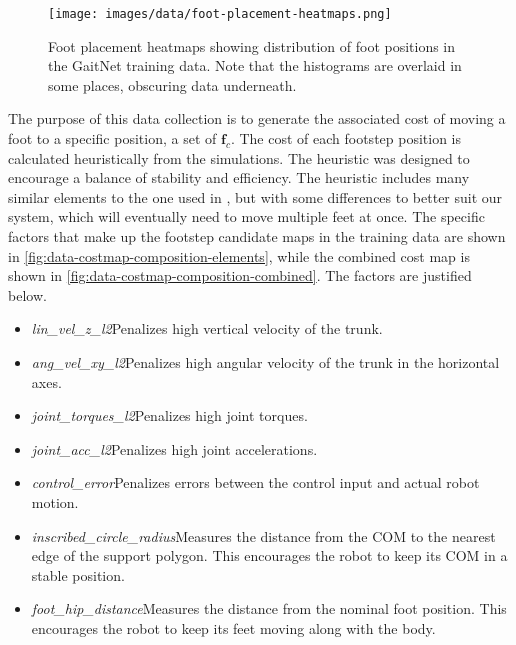 \begin{figure}[H]
  \centering
  \texttt{[image: images/data/foot-placement-heatmaps.png]}
  \caption{Foot placement heatmaps showing distribution of foot
    positions in the GaitNet training data. Note that the histograms
  are overlaid in some places, obscuring data underneath.}
  \label{fig:data-cn-training-distribution}
\end{figure}

The purpose of this data collection is to generate the associated cost of
moving a foot to a specific position, a set of $\mathbf f_c$. The cost
of each footstep position is calculated heuristically from the simulations.
The heuristic was designed to encourage a balance of stability and efficiency.
The heuristic includes many similar elements to the one used in
\cite{bratta_contactnet_2024}, but with some differences to better suit
our system, which will eventually need to move multiple feet at once.
The specific factors that make up the footstep candidate maps in the
training data
are shown in \autoref{fig:data-costmap-composition-elements}, while the
combined cost map is shown in \autoref{fig:data-costmap-composition-combined}.
The factors are justified below.

\begin{itemize}
  \item \textit{lin\_vel\_z\_l2}\textemdash Penalizes high vertical
    velocity of the trunk.
  \item \textit{ang\_vel\_xy\_l2}\textemdash Penalizes high angular
    velocity of the trunk in
    the horizontal axes.
  \item \textit{joint\_torques\_l2}\textemdash Penalizes high joint torques.
  \item \textit{joint\_acc\_l2}\textemdash Penalizes high joint accelerations.
  \item \textit{control\_error}\textemdash Penalizes errors between the control
    input and actual robot motion.
  \item \textit{inscribed\_circle\_radius}\textemdash Measures the distance
    from the COM to the nearest edge of the support polygon. This
    encourages the robot to keep its COM in a stable position.
  \item \textit{foot\_hip\_distance}\textemdash Measures the distance from
    the nominal foot position. This encourages the robot to keep its feet
    moving along with the body.
\end{itemize}

